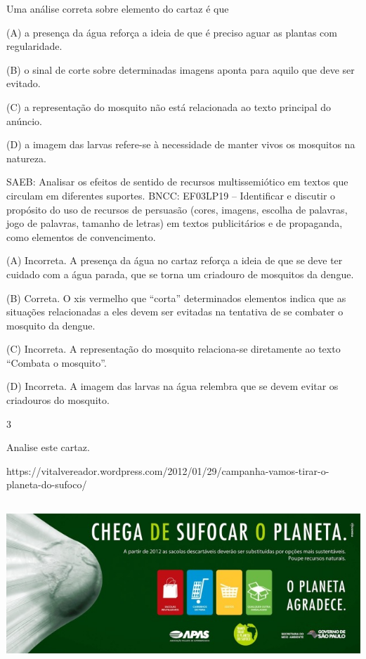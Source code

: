 \begin{boxlist}
{Uma análise correta sobre elemento do cartaz é que

(A) a presença da água reforça a ideia de que é preciso aguar as plantas com regularidade.

(B) o sinal de corte sobre determinadas imagens aponta para aquilo que deve ser evitado.

(C) a representação do mosquito não está relacionada ao texto principal do anúncio.

(D) a imagem das larvas refere-se à necessidade de manter vivos os mosquitos na natureza.

SAEB: Analisar os efeitos de sentido de recursos multissemiótico em textos que circulam em diferentes suportes.
BNCC: EF03LP19 -- Identificar e discutir o propósito do uso de recursos de
persuasão (cores, imagens, escolha de palavras, jogo de palavras,
tamanho de letras) em textos publicitários e de propaganda, como
elementos de convencimento.

(A) Incorreta. A presença da água no cartaz reforça a ideia de que se deve ter cuidado com a água parada, que se torna um criadouro de mosquitos da dengue.

(B) Correta. O xis vermelho que ``corta'' determinados elementos indica que as situações relacionadas a eles devem ser evitadas na tentativa de se combater o mosquito da dengue.

(C) Incorreta. A representação do mosquito relaciona-se diretamente ao texto ``Combata o mosquito''.

(D) Incorreta. A imagem das larvas na água relembra que se devem evitar os criadouros do mosquito.

\num{3}

Analise este cartaz.

https://vitalvereador.wordpress.com/2012/01/29/campanha-vamos-tirar-o-planeta-do-sufoco/

\includegraphics[width=6.14514in,height=2.43088in]{media/image14.jpeg}

}
\end{boxlist}
